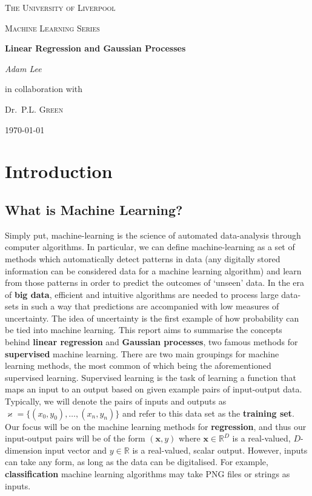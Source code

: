 \documentclass[10pt,a4paper]{article}
\author{Adam Lee}
\numberwithin{equation}{section}
\theoremstyle{plain}
\theoremstyle{own}
\begin{document}
\begin{titlepage}
	\centering
	
	{\scshape\LARGE The University of Liverpool \par}
	\vspace{1cm}
	{\scshape\Large Machine Learning Series \par}
	\vspace{1.5cm}
	{\huge\bfseries Linear Regression and Gaussian Processes\par}
	\vspace{2cm}
	{\Large\itshape Adam Lee\par}
	\vfill
	in collaboration with \par
	Dr.~P.L. \textsc{Green}

	\vfill


	{\large \today\par}
\end{titlepage}
\newpage
\tableofcontents
\pagebreak
\section*{Introduction} \label{sec:intro} 
\subsection*{What is Machine Learning?}
Simply put, machine-learning is the science of automated data-analysis through computer algorithms. In particular, we can define machine-learning as a set of methods which automatically detect patterns in data (any digitally stored information can be considered data for a machine learning algorithm) and learn from those patterns in order to predict the outcomes of `unseen' data. In the era of \textbf{big data}, efficient and intuitive algorithms are needed to process large data-sets in such a way that predictions are accompanied with low measures of uncertainty. The idea of uncertainty is the first example of how probability can be tied into machine learning. This report aims to summarise the concepts behind \textbf{linear regression} and \textbf{Gaussian processes}, two famous methods for \textbf{supervised} machine learning. There are two main groupings for machine learning methods, the most common of which being the aforementioned supervised learning. Supervised learning is the task of learning a function that maps an input to an output based on given example pairs of input-output data. Typically, we will denote the pairs of inputs and outputs as $\varkappa = \{ (x_0,y_0), \ldots, (x_n, y_n) \}$ and refer to this data set as the \textbf{training set}. Our focus will be on the machine learning methods for \textbf{regression}, and thus our input-output pairs will be of the form $(\mathbf{x}, y)$ where $\mathbf{x} \in \mathbb{R}^D$ is a real-valued, $D$-dimension input vector and $y \in \mathbb{R}$ is a real-valued, scalar output. However, inputs can take any form, as long as the data can be digitalised. For example, \textbf{classification} machine learning algorithms may take PNG files or strings as inputs.
\end{document}
